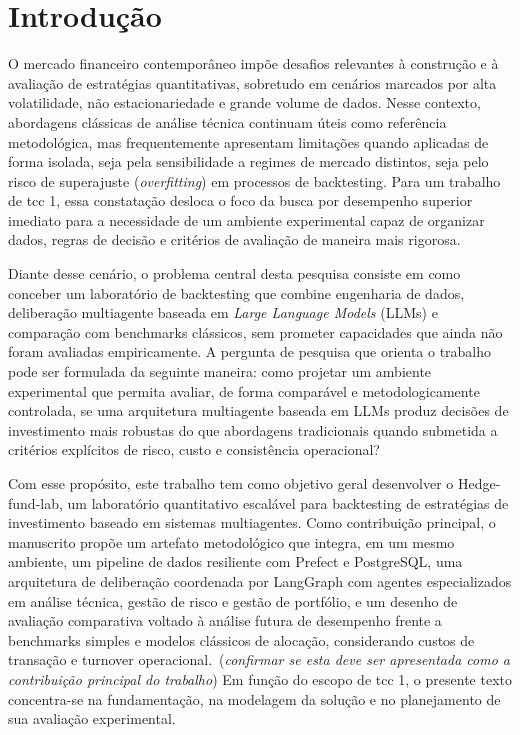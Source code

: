 \documentclass{eic-bcc-tcc}
\newcommand{\verify}[1]{{\color{blue} {#1}}}
\newcommand{\remarks}[2]{{\color{red} #1\ (\textit{#2})}}
\begin{document}
\listoffigurespage
\listoftablespage
\listofacronymspage
\tableofcontentspage

\mainmatter

\chapter{Introdução}
\label{cha:introducao}

O mercado financeiro contemporâneo impõe desafios relevantes à construção e à avaliação de estratégias quantitativas, sobretudo em cenários marcados por alta volatilidade, não estacionariedade e grande volume de dados. Nesse contexto, abordagens clássicas de análise técnica continuam úteis como referência metodológica, mas frequentemente apresentam limitações quando aplicadas de forma isolada, seja pela sensibilidade a regimes de mercado distintos, seja pelo risco de superajuste (\textit{overfitting}) em processos de backtesting. \verify{Para um trabalho de \gls{tcc} 1, essa constatação desloca o foco da busca por desempenho superior imediato para a necessidade de um ambiente experimental capaz de organizar dados, regras de decisão e critérios de avaliação de maneira mais rigorosa.}

\verify{Diante desse cenário, o problema central desta pesquisa consiste em como conceber um laboratório de backtesting que combine engenharia de dados, deliberação multiagente baseada em \textit{Large Language Models} (LLMs) e comparação com benchmarks clássicos, sem prometer capacidades que ainda não foram avaliadas empiricamente.} A pergunta de pesquisa que orienta o trabalho pode ser formulada da seguinte maneira: como projetar um ambiente experimental que permita avaliar, de forma comparável e metodologicamente controlada, se uma arquitetura multiagente baseada em LLMs produz decisões de investimento mais robustas do que abordagens tradicionais quando submetida a critérios explícitos de risco, custo e consistência operacional?

Com esse propósito, este trabalho tem como objetivo geral desenvolver o Hedge-fund-lab, um laboratório quantitativo escalável para backtesting de estratégias de investimento baseado em sistemas multiagentes. \remarks{Como contribuição principal, o manuscrito propõe um artefato metodológico que integra, em um mesmo ambiente, um pipeline de dados resiliente com Prefect e PostgreSQL, uma arquitetura de deliberação coordenada por LangGraph com agentes especializados em análise técnica, gestão de risco e gestão de portfólio, e um desenho de avaliação comparativa voltado à análise futura de desempenho frente a benchmarks simples e modelos clássicos de alocação, considerando custos de transação e turnover operacional.}{confirmar se esta deve ser apresentada como a contribuição principal do trabalho} \verify{Em função do escopo de \gls{tcc} 1, o presente texto concentra-se na fundamentação, na modelagem da solução e no planejamento de sua avaliação experimental.}
\end{document}
